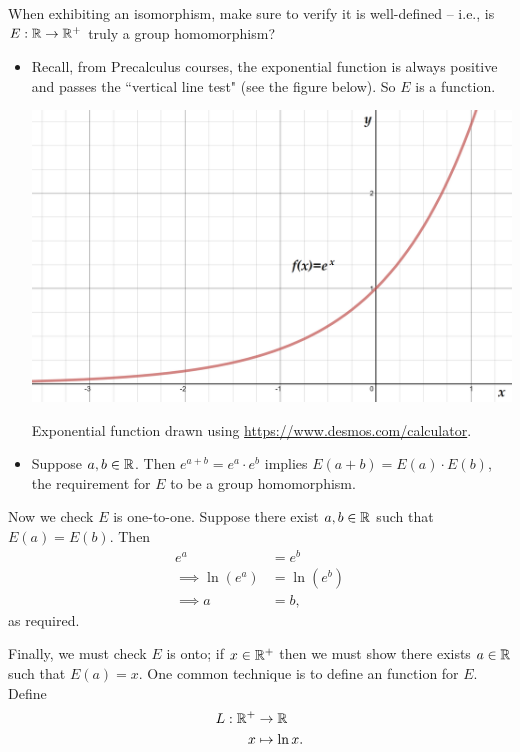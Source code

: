 \documentclass[../algebraNotesMSRI-UP2016.tex]{subfiles}
\begin{document}
\begin{frame}{}{}
\pf When exhibiting an isomorphism, make sure to verify it is well-defined -- i.e., is $E:\mathbb R\to \mathbb R^+$ truly a group homomorphism?
\begin{itemize}
\item Recall, from Precalculus courses, the exponential function is always positive and passes the ``vertical line test" (see the figure below).  So $E$ is a function.

\begin{center}
\includegraphics[scale=0.19]{expFunction}

{\footnotesize Exponential function drawn using \url{https://www.desmos.com/calculator}.}
\end{center}
\end{itemize}
\end{frame}

\begin{frame}
\begin{itemize}
\item Suppose $a,b\in\mathbb R$.  Then $e^{a+b}=e^a\cdot e^b$ implies $E(a+b)=E(a)\cdot E(b)$, the requirement for $E$ to be a group homomorphism.
\end{itemize}

\smallGap
Now we check $E$ is one-to-one.  Suppose there exist $a,b\in \mathbb R$ such that $E(a)=E(b)$.  Then 
\begin{align*}
e^a &= e^b \\
\implies \ln{(e^a)} &= \ln{(e^b)} \\
\implies a &= b,
\end{align*}
as required.

\smallGap
Finally, we must check $E$ is onto; if $x\in\mathbb R^+$ then we must show there exists $a\in\mathbb R$ such that $E(a)=x$.  One common technique is to define an  function for $E$.  Define
\begin{align*}
L:\mathbb R^+ &\to \mathbb R \\
x &\mapsto \ln x.
\end{align*}
\end{frame}
\end{document}
